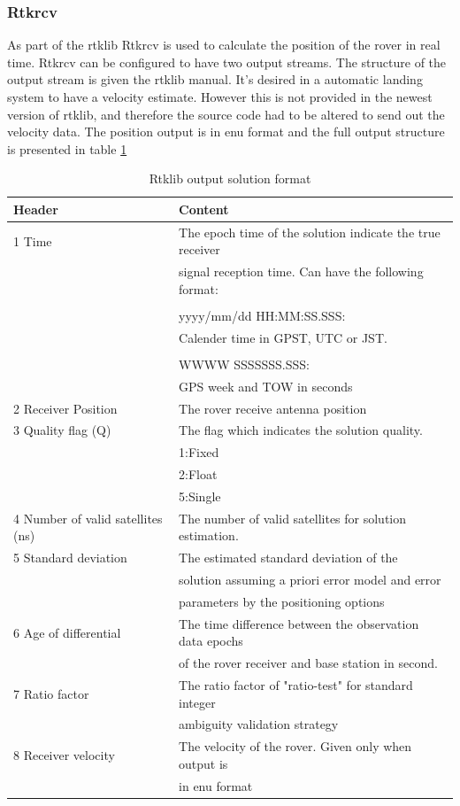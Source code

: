 \subsubsection{Rtkrcv}
As part of the \gls{rtklib} Rtkrcv is  used to calculate the position of the rover in real time.
Rtkrcv can be configured to have two output streams. The structure of the output stream is given the \gls{rtklib} manual\citep{Rtklib242}. It's desired in a automatic landing system to have a velocity estimate. However this is not provided in the newest version of \gls{rtklib}, and therefore the source code had to be altered to send out the velocity data. The position output is in \gls{enu} format and the full output structure is presented in table \ref{Tb:RtklibOutput}
\begin{table}[H]
\begin{center}
    \begin{tabular}{ | l | l |}
    \hline
    \textbf{Header} & \textbf{Content} \\ \hline
     1 Time & The epoch time of the solution indicate the true receiver\\& signal reception time. Can have the following format:\\&\\& yyyy/mm/dd HH:MM:SS.SSS:\\& Calender time in GPST, UTC or JST.\\&\\&
     
     WWWW SSSSSSS.SSS:\\&
     GPS week and TOW in seconds  \\ \hline
     2 Receiver Position & The rover receive antenna position \\ \hline
     3 Quality flag (Q) & The flag which indicates the solution quality.\\& 1:Fixed\\& 2:Float\\& 5:Single \\ \hline
     4 Number of valid satellites (ns) & The number of valid satellites for solution estimation. \\ \hline
     5 Standard deviation & The estimated standard deviation of the\\& solution assuming a priori error model and error\\& parameters by the positioning options \\ \hline
     6 Age of differential & The time difference between the observation data epochs\\& of the rover receiver and base station in second. \\ \hline
     7 Ratio factor & The ratio factor of "ratio-test" for standard integer\\& ambiguity validation strategy \\ \hline
     8 Receiver velocity & The velocity of the rover. Given only when output is\\& in enu format \\ \hline
    \end{tabular}
\end{center}
\caption{Rtklib output solution format }
\label{Tb:RtklibOutput}
\end{table}

